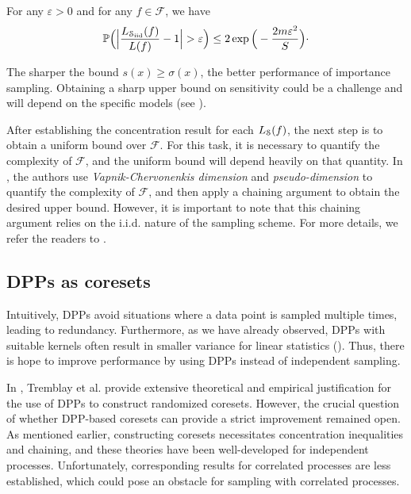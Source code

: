 \begin{proposition} \label{p:concentration-iid}
    For any $\varepsilon>0$ and for any $f\in \mathcal F$, we have
    \[ \mathbb P \Big ( \Big |\frac{L_{\mathcal S_{\mathrm{iid}}}(f)}{L(f)} -1 \Big | > \varepsilon \Big ) \le 2 \exp \Big ( -\frac{2m \varepsilon^2}{S} \Big ) \cdot \]
\end{proposition}

The sharper the bound $s(x) \ge \sigma(x)$, the better performance of importance sampling. Obtaining a sharp upper bound on sensitivity could be a challenge and will depend on the specific models (see \cite{bachem2017coresetML}). 

After establishing the concentration result for each  $L_{\mathcal{S}}(f)$,  the next step is to obtain a uniform bound over $\mathcal F$.  For this task, it is necessary to quantify the complexity of $\mathcal F$, and the uniform bound will depend heavily on that quantity. In \cite{bachem2017coresetML}, the authors use \emph{Vapnik-Chervonenkis dimension} \cite{VCdim} and \emph{pseudo-dimension} to quantify the complexity of $\mathcal F$, and then apply a chaining argument to obtain the desired upper bound. However, it is important to note that this chaining argument relies on the i.i.d. nature of the sampling scheme. For more details, we refer the readers to \cite{bachem2017coresetML}.

\subsection{DPPs as coresets}

 Intuitively, DPPs avoid situations where a data point is sampled multiple times, leading to redundancy. Furthermore, as we have already observed, DPPs with suitable kernels often result in smaller variance for linear statistics (\cite{OPE-AOAP, OPE-NIPS}). 
Thus, there is hope to improve performance by using DPPs instead of independent sampling.

In \cite{tremblay2019determinantal}, Tremblay et al. provide extensive theoretical and empirical justification for the use of DPPs to construct randomized coresets.  However, the crucial question of whether DPP-based coresets can provide a strict improvement remained open. As mentioned earlier, constructing coresets necessitates concentration inequalities and chaining, and these theories have been well-developed for independent processes. Unfortunately, corresponding results for correlated processes are less established, which could pose an obstacle for sampling with correlated processes.

